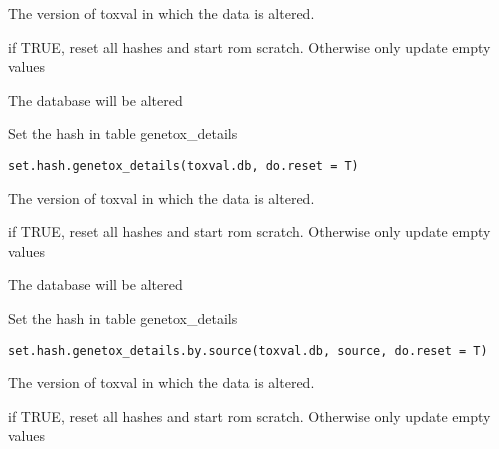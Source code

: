 \documentclass[letterpaper]{book}
\begin{document}
%
\begin{Arguments}
\begin{ldescription}
\item[\code{toxval.db}] The version of toxval in which the data is altered.

\item[\code{do.reset}] if TRUE, reset all hashes and start rom scratch.
Otherwise only update empty values
\end{ldescription}
\end{Arguments}
%
\begin{Value}
The database will be altered
\end{Value}
%
\begin{Description}\relax
Set the hash in table genetox\_details
\end{Description}
%
\begin{Usage}
\begin{verbatim}
set.hash.genetox_details(toxval.db, do.reset = T)
\end{verbatim}
\end{Usage}
%
\begin{Arguments}
\begin{ldescription}
\item[\code{toxval.db}] The version of toxval in which the data is altered.

\item[\code{do.reset}] if TRUE, reset all hashes and start rom scratch.
Otherwise only update empty values
\end{ldescription}
\end{Arguments}
%
\begin{Value}
The database will be altered
\end{Value}
%
\begin{Description}\relax
Set the hash in table genetox\_details
\end{Description}
%
\begin{Usage}
\begin{verbatim}
set.hash.genetox_details.by.source(toxval.db, source, do.reset = T)
\end{verbatim}
\end{Usage}
%
\begin{Arguments}
\begin{ldescription}
\item[\code{toxval.db}] The version of toxval in which the data is altered.

\item[\code{do.reset}] if TRUE, reset all hashes and start rom scratch.
Otherwise only update empty values
\end{ldescription}
\end{Arguments}
\end{document}
